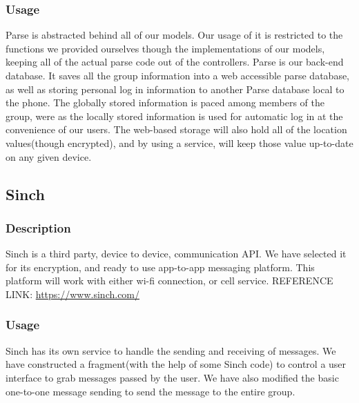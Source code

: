 	\subsubsection{Usage}
	Parse is abstracted behind all of our models. Our usage of it is restricted to the functions we provided ourselves though the implementations of our models, keeping all of the actual parse code out of the controllers.
	Parse is our back-end database. It saves all the group information into a web accessible parse database, as well as storing personal log in information to another Parse database local to the phone. The globally stored information is paced among members of the group, were as the locally stored information is used for automatic log in at the convenience of our users. The web-based storage will also hold all of the location values(though encrypted), and by using a service, will keep those value up-to-date on any given device.
	
\subsection{Sinch}
	\subsubsection{Description}
	Sinch is a third party, device to device, communication API. We have selected it for its encryption, and ready to use app-to-app messaging platform. This platform will work with either wi-fi connection, or cell service. 
\newline
REFERENCE LINK: \url{https://www.sinch.com/}
	
	\subsubsection{Usage}
	Sinch has its own service to handle the sending and receiving of messages. We have constructed a fragment(with the help of some Sinch code) to control a user interface to grab messages passed by the user. We have also modified the basic one-to-one message sending to send the message to the entire group.



